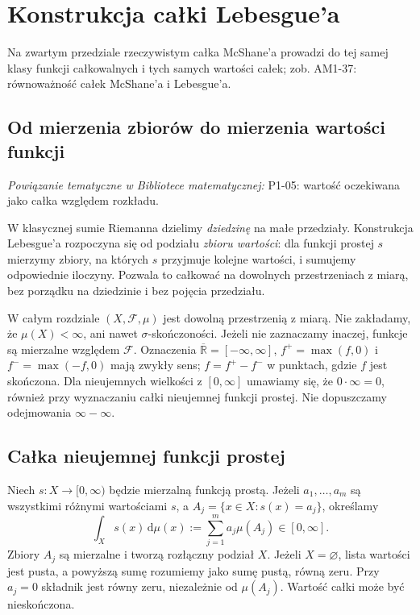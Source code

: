 \chapter{Konstrukcja całki Lebesgue'a}
\label{ch:calkowanie-lebesgue}

\providecommand{\atlasref}[2]{#2}

Na zwartym przedziale rzeczywistym całka McShane'a prowadzi do tej samej klasy funkcji całkowalnych i tych samych wartości całek; zob. \atlasref{AM1-37::it:thm:mcshane-lebesgue}{AM1-37: równoważność całek McShane'a i Lebesgue'a}.




\section{Od mierzenia zbiorów do mierzenia wartości funkcji}

\noindent\emph{Powiązanie tematyczne w Bibliotece matematycznej:} \atlasref{P1-05::ch:expectation}{P1-05: wartość oczekiwana jako całka względem rozkładu}.


W klasycznej sumie Riemanna dzielimy \emph{dziedzinę} na małe
przedziały. Konstrukcja Lebesgue'a rozpoczyna się od podziału
\emph{zbioru wartości}: dla funkcji prostej $s$ mierzymy zbiory,
na których $s$ przyjmuje kolejne wartości, i sumujemy odpowiednie
iloczyny. Pozwala to całkować na dowolnych przestrzeniach z miarą,
bez porządku na dziedzinie i bez pojęcia przedziału.

W całym rozdziale $(X,\mathcal F,\mu)$ jest dowolną przestrzenią
z miarą. Nie zakładamy, że $\mu(X)<\infty$, ani nawet
$\sigma$-skończoności. Jeżeli nie zaznaczamy inaczej,
funkcje są mierzalne względem $\mathcal F$.
Oznaczenia $\overline{\mathbb R}=[-\infty,\infty]$,
$f^+=\max(f,0)$ i $f^-=\max(-f,0)$ mają zwykły sens;
$f=f^+-f^-$ w punktach, gdzie $f$ jest skończona.
Dla nieujemnych wielkości z $[0,\infty]$ umawiamy się,
że $0\cdot\infty=0$, również przy wyznaczaniu całki
nieujemnej funkcji prostej. Nie dopuszczamy odejmowania
$\infty-\infty$.

\section{Całka nieujemnej funkcji prostej}

\begin{definicja}
\label{def:integral-simple}
Niech $s:X\to[0,\infty)$ będzie mierzalną funkcją prostą.
Jeżeli $a_1,\ldots,a_m$ są wszystkimi różnymi wartościami $s$,
a $A_j=\{x\in X:s(x)=a_j\}$, określamy
\begin{equation}\label{eq:simple-integral}
\int_X s(x)\,\mathrm d\mu(x)
:=\sum_{j=1}^{m}a_j\mu(A_j)\in[0,\infty].
\end{equation}
Zbiory $A_j$ są mierzalne i tworzą rozłączny podział $X$.
Jeżeli $X=\varnothing$, lista wartości jest pusta,
a powyższą sumę rozumiemy jako sumę pustą, równą zeru.
Przy $a_j=0$ składnik jest równy zeru, niezależnie od
$\mu(A_j)$. Wartość całki może być nieskończona.
\end{definicja}

